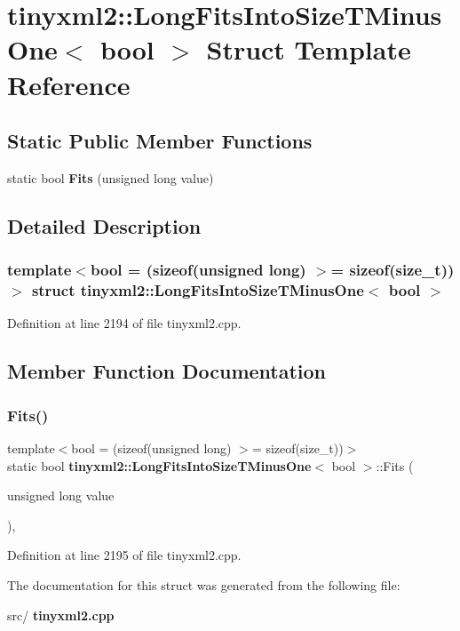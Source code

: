 \section{tinyxml2\+:\+:Long\+Fits\+Into\+Size\+T\+Minus\+One$<$ bool $>$ Struct Template Reference}
\label{structtinyxml2_1_1_long_fits_into_size_t_minus_one}
\subsection*{Static Public Member Functions}
\begin{DoxyCompactItemize}
\item 
static bool \textbf{ Fits} (unsigned long value)
\end{DoxyCompactItemize}


\subsection{Detailed Description}
\subsubsection*{template$<$bool = (sizeof(unsigned long) $>$= sizeof(size\+\_\+t))$>$\newline
struct tinyxml2\+::\+Long\+Fits\+Into\+Size\+T\+Minus\+One$<$ bool $>$}



Definition at line 2194 of file tinyxml2.\+cpp.



\subsection{Member Function Documentation}
\mbox{\label{structtinyxml2_1_1_long_fits_into_size_t_minus_one_a3057710104ab733963eb32fda0bc374c}} 
\subsubsection{Fits()}
{\footnotesize\ttfamily template$<$bool  = (sizeof(unsigned long) $>$= sizeof(size\+\_\+t))$>$ \\
static bool \textbf{ tinyxml2\+::\+Long\+Fits\+Into\+Size\+T\+Minus\+One}$<$ bool $>$\+::Fits (\begin{DoxyParamCaption}\item[{unsigned long}]{value }\end{DoxyParamCaption})\hspace{0.3cm}{\ttfamily [inline]}, {\ttfamily [static]}}



Definition at line 2195 of file tinyxml2.\+cpp.



The documentation for this struct was generated from the following file\+:\begin{DoxyCompactItemize}
\item 
src/\textbf{ tinyxml2.\+cpp}\end{DoxyCompactItemize}
